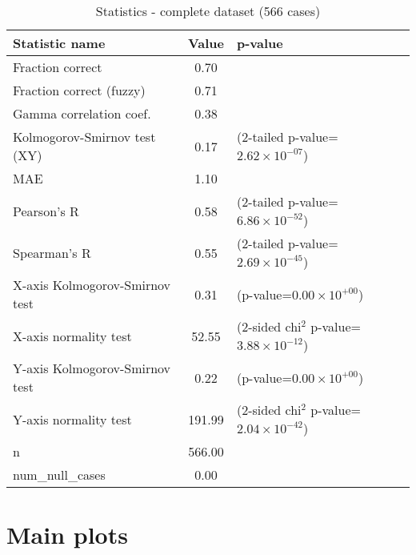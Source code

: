 \documentclass[10pt, letterpaper, oneside, titlepage, landscape]{scrreprt}
\begin{document}
\begin{table}[H]\begin{center}
\begin{tabular}{ l S[table-format=3.2] l}
Statistic name & {Value} & p-value\\
\hline
Fraction correct & 0.70 & \\
Fraction correct (fuzzy) & 0.71 & \\
Gamma correlation coef. & 0.38 & \\
Kolmogorov-Smirnov test (XY) & 0.17 & (2-tailed p-value=$2.62\times10^{-07}$)\\
MAE & 1.10 & \\
Pearson's R & 0.58 & (2-tailed p-value=$6.86\times10^{-52}$)\\
Spearman's R & 0.55 & (2-tailed p-value=$2.69\times10^{-45}$)\\
X-axis Kolmogorov-Smirnov test & 0.31 & (p-value=$0.00\times10^{+00}$)\\
X-axis normality test & 52.55 & (2-sided chi$^{2}$ p-value=$3.88\times10^{-12}$)\\
Y-axis Kolmogorov-Smirnov test & 0.22 & (p-value=$0.00\times10^{+00}$)\\
Y-axis normality test & 191.99 & (2-sided chi$^{2}$ p-value=$2.04\times10^{-42}$)\\
n & 566.00 & \\
num\_null\_cases & 0.00 & \\
\end{tabular}
\caption{Statistics - complete dataset (566 cases)}
\end{center}\end{table}



\clearpage

\section{Main plots}
\end{document}

